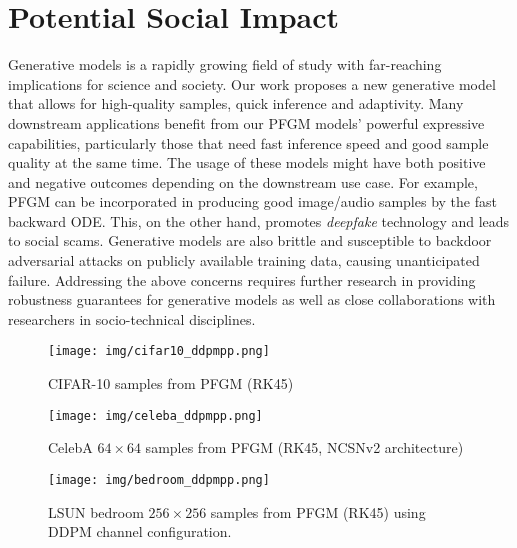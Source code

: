 \section{Potential Social Impact}
\label{app:impact}

Generative models is a rapidly growing field of study with far-reaching implications for science and society. 
Our work proposes a new generative model that allows for high-quality samples, quick inference and adaptivity. Many downstream applications benefit from our PFGM models' powerful expressive capabilities, particularly those that need fast inference speed and good sample quality at the same time. The usage of these models might have both positive and negative outcomes depending on the downstream use case. 
For example, PFGM can be incorporated in producing good image/audio samples by the fast backward ODE. This, on the other hand, promotes \textit{deepfake} technology and leads to social scams. Generative models are also brittle and susceptible to backdoor adversarial attacks on publicly available training data, causing unanticipated failure.
Addressing the above concerns requires further research in providing robustness guarantees for generative models as well as close collaborations with researchers in socio-technical disciplines.




\begin{figure*}
    \centering
    \texttt{[image: img/cifar10\_ddpmpp.png]}
    \caption{CIFAR-10 samples from PFGM (RK45)}
    \label{fig:extend-cifar}
\end{figure*}

\begin{figure*}
    \centering
    \texttt{[image: img/celeba\_ddpmpp.png]}
    \caption{CelebA $64 \times 64$ samples from PFGM (RK45, NCSNv2 architecture)}
    \label{fig:extend-celeba}
\end{figure*}



\begin{figure*}
    \centering
    \texttt{[image: img/bedroom\_ddpmpp.png]}
    \caption{LSUN bedroom $256 \times 256$ samples from PFGM (RK45) using DDPM channel configuration.}
    \label{fig:extend-bedroom-ddpm}
\end{figure*}
\clearpage




